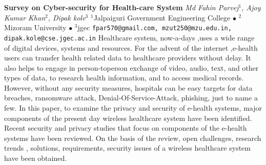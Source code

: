 
    \begin{conf-abstract}[]
        {\textbf{Survey on Cyber-security for Health-care System}}
        {\textit{Md Fahin Parvej$^{1}$, Ajoy Kumar Khan$^{2}$, Dipak kole$^{3}$}}
        {$^{1}$Jalpaiguri Government Engineering College $\bullet$ $^{2}$Mizoram University $\bullet$ $^{3}$jgec}
        {\texttt{fpar570@gmail.com, mzut250@mzu.edu.in, dipak.kole@cse.jgec.ac.in}}
        {Healthcare system, now-a-days ,uses a wide range of digital devices, systems and resources. For the advent of the internet ,e-health users can transfer health related data to healthcare providers without delay. It also helps to engage in person-toperson exchange of video, audio, text, and other types of data, to research health information, and to access medical records. However, without any security measures, hospitals can be easy targets for data breaches, ransomware attack, Denial-Of-Service-Attack, phishing, just to name a few. In this paper, to examine the privacy and security of e-health systems, major components of the present day wireless healthcare system have been identified. Recent security and privacy studies that focus on components of the e-health systems have been reviewed. On the basis of the review, open challenges, research trends , solutions, requirements, security issues of a wireless healthcare system have been obtained.}
    \end{conf-abstract}
        